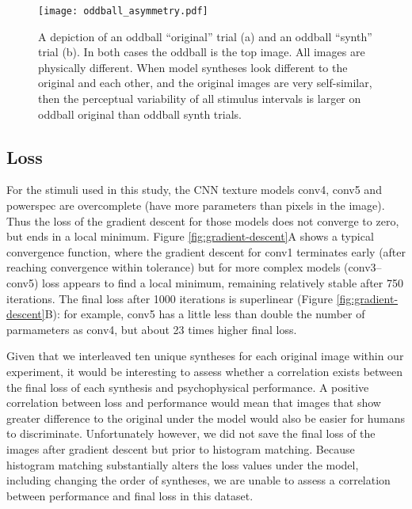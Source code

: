 \documentclass[doc, 11pt,a4paper,natbib]{apa6}\usepackage[]{graphicx}\usepackage[]{color}
\begin{document}
\begin{figure*}
\centering
\texttt{[image: oddball\_asymmetry.pdf]}
\caption{
A depiction of an oddball ``original'' trial (a) and an oddball ``synth'' trial (b). 
In both cases the oddball is the top image.
All images are physically different.
When model syntheses look different to the original and each other, and the original images are very self-similar, then the perceptual variability of all stimulus intervals is larger on oddball original than oddball synth trials.
}
\label{fig:oddball-demo}
\end{figure*}


\subsection{Loss}



For the stimuli used in this study, the CNN texture models conv4, conv5 and powerspec are overcomplete (have more parameters than pixels in the image). 
Thus the loss of the gradient descent for those models does not converge to zero, but ends in a local minimum.
Figure \ref{fig:gradient-descent}A shows a typical convergence function, where the gradient descent for conv1 terminates early (after reaching convergence within tolerance) but for more complex models (conv3--conv5) loss appears to find a local minimum, remaining relatively stable after 750 iterations.
The final loss after 1000 iterations is superlinear (Figure \ref{fig:gradient-descent}B): for example, conv5 has a little less than double the number of parmameters as conv4, but about 23 times higher final loss.

Given that we interleaved ten unique syntheses for each original image within our experiment, it would be interesting to assess whether a correlation exists between the final loss of each synthesis and psychophysical performance.
A positive correlation between loss and performance would mean that images that show greater difference to the original under the model would also be easier for humans to discriminate.
Unfortunately however, we did not save the final loss of the images after gradient descent but prior to histogram matching.
Because histogram matching substantially alters the loss values under the model, including changing the order of syntheses, we are unable to assess a correlation between performance and final loss in this dataset. 
\end{document}
